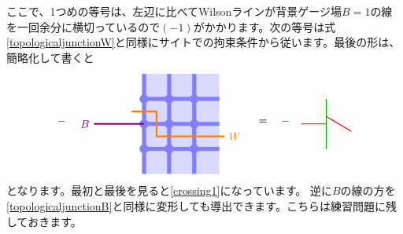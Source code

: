 \documentclass[report,paper=a4, fontsize=12pt, line_length=16cm, number_of_lines=33,dvipdfmx]{jlreq}
\numberwithin{equation}{chapter}
\begin{document}
ここで、1つめの等号は、左辺に比べてWilsonラインが背景ゲージ場$B=1$の線を一回余分に横切っているので$(-1)$がかかります。次の等号は式\eqref{topologicaljunctionW}と同様にサイトでの拘束条件から従います。最後の形は、簡略化して書くと
\begin{align}
  - \quad
  \begin{tikzpicture}[baseline=0cm,scale=0.8]
    \foreach \x in {0,1,2}{
        \foreach \y in {-2,-1,...,1}{
        \fill[plaqblue](\x,\y) rectangle (\x+1,\y+1);
        }
    }
    \foreach \x in {0,1,2}{
        \foreach \y in {-1,0,1}{
            \fill[linkblue] (\x,\y) circle (1.8mm);
        }
    }
    \foreach \x in {0,1,2}{
        \foreach \y in {-1,0,1}{
            \draw[linkblue, line width = 1.3mm](\x,\y)--(\x + 1,\y);
        }
    }
    \foreach \x in {0,1,2}{
        \foreach \y in {-2,-1,...,1}{
            \draw[linkblue, line width = 1.3mm](\x,\y)--(\x,\y + 1);
        }
    }
    \draw[red!50!yellow, ultra thick](-0.5, 0.5)--(0.5, 0.5)--(0.5,-0.5)--(3.2,-0.5) node[right]{$W$};
    \draw[red!50!blue, ultra thick](0,0)--(-2,0) node[left]{$B$};
\end{tikzpicture}
\quad=\quad -\quad
\begin{tikzpicture}[baseline=0,scale=0.8]
    \draw[darkgreen,thick] (0,1)--(0,-1);
    \draw[red,thick] (-1,0)--(0,0);
    \draw[red,thick] (1,-0.3)--(0,0.3);
\end{tikzpicture}
\end{align}
となります。最初と最後を見ると\eqref{crossing1}になっています。
逆に$B$の線の方を\eqref{topologicaljunctionB}と同様に変形しても導出できます。こちらは練習問題に残しておきます。
\end{document}
